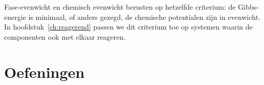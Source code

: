 Fase-evenwicht en chemisch evenwicht berusten op hetzelfde criterium: de Gibbs-energie is minimaal, of anders gezegd, de chemische potentialen zijn in evenwicht. In hoofdstuk~\ref{ch:reagerend} passen we dit criterium toe op systemen waarin de componenten ook met elkaar reageren.



\newpage
\section{Oefeningen}


